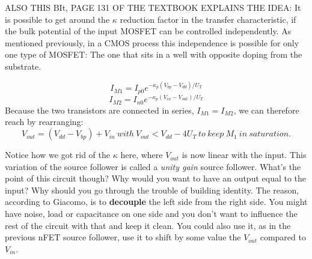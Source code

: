 ALSO THIS BIt, PAGE 131 OF THE TEXTBOOK EXPLAINS THE IDEA: 
It is possible to get around the $\kappa$ reduction factor in the transfer characteristic, if the bulk potential of the input MOSFET can be controlled independently. As mentioned previously, in a CMOS process this independence is possible for only one type of MOSFET: The one that sits in a well with opposite doping from the substrate.

\begin{equation}
I_{M1} = I_{p0}e^{-\kappa_p(V_{bp} - V_{dd})/U_T}
\end{equation}
\begin{equation}
I_{M2} = I_{n0}e^{-\kappa_p(V_{in} - V_{out})/U_T}
\end{equation}
Because the two transistors are connected in series, $I_{M1} = I_{M2}$, we can therefore reach by rearranging:
\begin{equation}
V_{out} = (V_{dd} - V_{bp}) + V_{in} \ with \ V_{out} < V_{dd} - 4U_T \ to \ keep \ M_1 \ in \ saturation.
\end{equation}

Notice how we got rid of the $\kappa$ here, where $V_{out}$ is now linear with the input. This variation of the source follower is called a \textit{unity gain} source follower. What's the point of this circuit though? Why would you want to have an output equal to the input? Why should you go through the trouble of building identity. The reason, according to Giacomo, is to \textbf{decouple} the left side from the right side. You might have noise, load or capacitance on one side and you don't want to influence the rest of the circuit with that and keep it clean. You could also use it, as in the previous nFET source follower, use it to shift by some value the $V_{out}$ compared to $V_{in}$.
